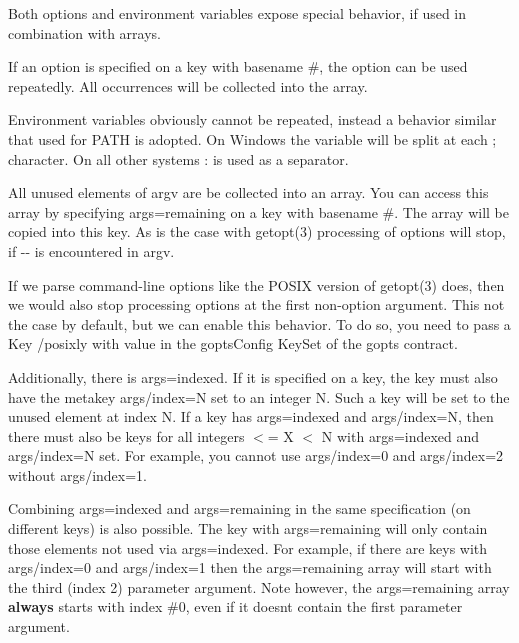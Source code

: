 Both options and environment variables expose special behavior, if used in combination with arrays.

If an option is specified on a key with basename {\ttfamily \#}, the option can be used repeatedly. All occurrences will be collected into the array.

Environment variables obviously cannot be repeated, instead a behavior similar that used for P\+A\+TH is adopted. On Windows the variable will be split at each \textquotesingle{};\textquotesingle{} character. On all other systems \textquotesingle{}\+:\textquotesingle{} is used as a separator.

All unused elements of {\ttfamily argv} are be collected into an array. You can access this array by specifying {\ttfamily args=remaining} on a key with basename {\ttfamily \#}. The array will be copied into this key. As is the case with getopt(3) processing of options will stop, if {\ttfamily -\/-\/} is encountered in {\ttfamily argv}.

If we parse command-\/line options like the P\+O\+S\+IX version of getopt(3) does, then we would also stop processing options at the first non-\/option argument. This not the case by default, but we can enable this behavior. To do so, you need to pass a Key {\ttfamily /posixly} with value {} in the {\ttfamily gopts\+Config} Key\+Set of the {\ttfamily gopts} contract.

Additionally, there is {\ttfamily args=indexed}. If it is specified on a key, the key must also have the metakey {\ttfamily args/index=N} set to an integer {\ttfamily N}. Such a key will be set to the unused element at index {\ttfamily N}. If a key has {\ttfamily args=indexed} and {\ttfamily args/index=N}, then there must also be keys for all integers { $<$= X $<$ N} with {\ttfamily args=indexed} and {\ttfamily args/index=N} set. For example, you cannot use {\ttfamily args/index=0} and {\ttfamily args/index=2} without {\ttfamily args/index=1}.

Combining {\ttfamily args=indexed} and {\ttfamily args=remaining} in the same specification (on different keys) is also possible. The key with {\ttfamily args=remaining} will only contain those elements not used via {\ttfamily args=indexed}. For example, if there are keys with {\ttfamily args/index=0} and {\ttfamily args/index=1} then the {\ttfamily args=remaining} array will start with the third (index 2) parameter argument. Note however, the {\ttfamily args=remaining} array {\bfseries always} starts with index {\ttfamily \#0}, even if it doesn\textquotesingle{}t contain the first parameter argument.


